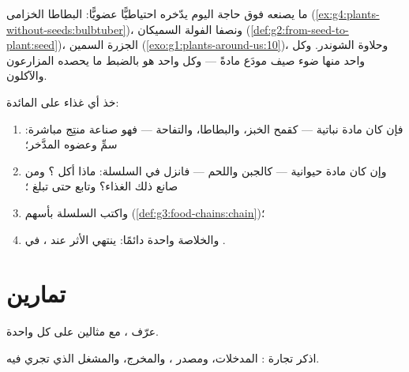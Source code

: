 \begin{example}\label{ex:g6:plants-are-producers:pantry}
ما يصنعه  فوق حاجة اليوم يدّخره احتياطيًّا عضويًّا: 
البطاطا  الخزامى
(\cref{ex:g4:plants-without-seeds:bulbtuber})، ونصفا الفولة
السميكان (\cref{def:g2:from-seed-to-plant:seed})،  الجزرة
السمين (\cref{exo:g1:plants-around-us:10})، وحلاوة الشوندر. وكل
واحد منها ضوء صيف مودَع مادةً --- وكل واحد هو بالضبط ما يحصده
المزارعون والآكلون.
\end{example}

\begin{method}\label{met:g6:plants-are-producers:trace}
خذ أي غذاء على المائدة:
\begin{enumerate}
  \item فإن كان مادة نباتية --- كقمح الخبز، والبطاطا، والتفاحة
        --- فهو صناعة منتِج مباشرة: سمِّ  وعضوه المدَّخر؛
  \item وإن كان مادة حيوانية --- كالجبن  واللحم --- فانزل
        في السلسلة: ماذا أكل ؟ ومن صانع ذلك الغذاء؟ وتابع
        حتى تبلغ ؛
  \item واكتب السلسلة بأسهم
        (\cref{def:g3:food-chains:chain})؛
  \item والخلاصة واحدة دائمًا: ينتهي الأثر عند ، في .
\end{enumerate}
\end{method}

\section{تمارين}

\begin{exercise}[$\star$]\label{exo:g6:plants-are-producers:1}
عرّف  ، مع مثالين على كل واحدة.
\end{exercise}

\begin{exercise}[$\star$]\label{exo:g6:plants-are-producers:2}
اذكر تجارة : المدخلات، ومصدر ، والمخرج، والمشغل
الذي تجري فيه.
\end{exercise}

